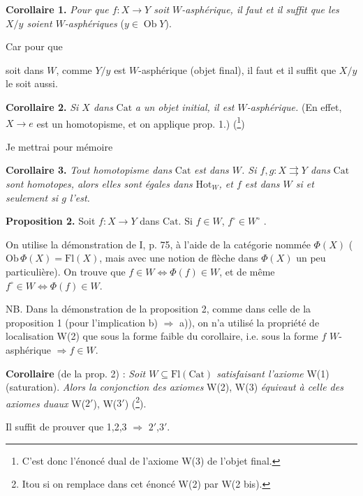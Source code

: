 \documentclass[11pt]{article}
\newcommand{\printedpage}[1]{\marginpar{\footnotesize p.~#1}}
\newcommand{\msp}[1]{\marginpar{\footnotesize [#1]}}
\newcommand{\Hot}{\mathrm{Hot}}
\newcommand{\Cat}{\mathrm{Cat}}
\newcommand{\Ob}{\operatorname{Ob}}
\newcommand{\fl}{\longrightarrow}
\begin{document}
\textbf{Corollaire 1.} \textit{Pour que $f : X \fl Y$ soit $W$-asphérique, il faut et il suffit que les $X/y$ soient $W$-asphériques} ($y \in \Ob Y$).

Car pour que
soit dans $W$, comme $Y/y$ est $W$-asphérique (objet final), il faut et il suffit que $X/y$ le soit aussi.

\textbf{Corollaire 2.} \textit{Si $X$ dans} $\Cat$ \textit{a un objet initial, il est $W$-asphérique.} (En effet, $X \fl e$ est un homotopisme, et on applique prop. 1.) (\footnote{C'est donc l'énoncé dual de l'axiome W(3) de l'objet final.})

Je mettrai pour mémoire

\textbf{Corollaire 3.} \textit{Tout homotopisme dans} $\Cat$ \textit{est dans $W$. Si $f, g : X \rightrightarrows Y$ dans} $\Cat$ \textit{sont homotopes, alors elles sont égales dans} $\Hot_W$\textit{, et $f$ est dans $W$ si et seulement si $g$ l'est.}

\textbf{Proposition 2.} Soit $f : X \fl Y$ dans $\Cat$. Si $f \in W$, $f^\circ \in W^\circ$ .

\printedpage{4}
On utilise la démonstration de I, p. 75, à l'aide de la catégorie nommée $\Phi(X)$ ($\mathrm{Ob}\,\Phi(X) = \mathrm{Fl}(X)$, mais avec une notion de flèche dans $\Phi(X)$ un peu particulière). On trouve que $f \in W \iff \Phi(f) \in W$, et de même $f^\circ \in W \iff \Phi(f) \in W$.

NB. Dans la démonstration de la proposition 2, comme dans celle de la proposition 1 (pour l'implication b) $\Longrightarrow$ a)), on n'a utilisé la propriété de localisation W(2) que sous la forme faible du corollaire, i.e. sous la forme $f$ $W$-asphérique $\Longrightarrow f \in W$.

\textbf{Corollaire} (de la prop. 2) : \textit{Soit $W \subseteq \mathrm{Fl}(\mathrm{Cat})$ satisfaisant l'axiome} W(1) (saturation). \textit{Alors la conjonction des axiomes} W(2), W(3) \textit{équivaut à celle des axiomes duaux} W($2'$), W($3'$) (\footnote[5]{Itou si on remplace dans cet énoncé W(2) par W(2 bis).}).

Il suffit de prouver que 1,2,3 $\Longrightarrow$ $2'$,$3'$.

\msp{page 4}
\end{document}
